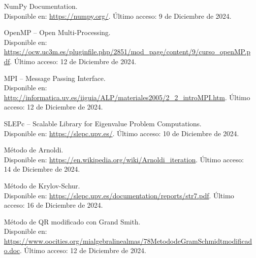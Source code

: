 \documentclass{article}
\begin{document}
\begin{thebibliography}{9}
NumPy Documentation.  \\
Disponible en: \url{https://numpy.org/}.  
Último acceso: 9 de Diciembre de 2024.

OpenMP – Open Multi-Processing.\\
Disponible en: \url{https://ocw.uc3m.es/pluginfile.php/2851/mod_page/content/9/curso_openMP.pdf}.  
Último acceso: 12 de Diciembre de 2024.

MPI – Message Passing Interface.\\
Disponible en: \url{http://informatica.uv.es/iiguia/ALP/materiales2005/2_2_introMPI.htm}.  
Último acceso: 12 de Diciembre de 2024.

SLEPc – Scalable Library for Eigenvalue Problem Computations.\\
Disponible en: \url{https://slepc.upv.es/}.  
Último acceso: 10 de Diciembre de 2024.

Método de Arnoldi.\\
Disponible en: \url{https://en.wikipedia.org/wiki/Arnoldi_iteration}.  
Último acceso: 14 de Diciembre de 2024.

Método de Krylov-Schur.\\
Disponible en: \url{https://slepc.upv.es/documentation/reports/str7.pdf}.  
Último acceso: 16 de Diciembre de 2024.

Método de QR modificado con Grand Smith.\\
Disponible en: \url{https://www.oocities.org/mialgebralinealmas/78MetododeGramSchmidtmodificado.doc}. 
Último acceso: 12 de Diciembre de 2024.




\end{thebibliography}
\end{document}
